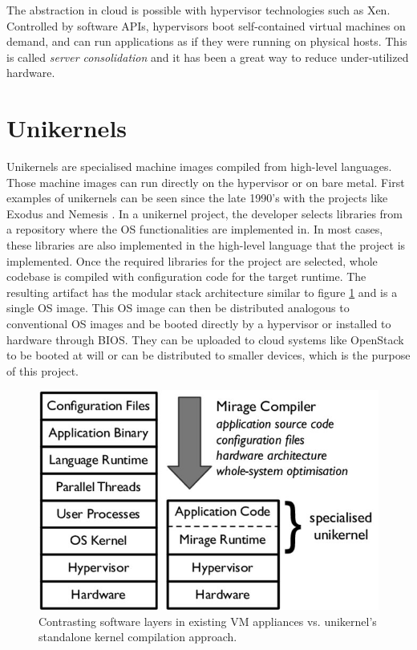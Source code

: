 The abstraction in cloud is possible with hypervisor technologies such as Xen. Controlled by software APIs, hypervisors boot self-contained virtual machines on demand, and can run applications as if they were running on physical hosts. This is called \textit{server consolidation} and it has been a great way to reduce under-utilized hardware.

\section{Unikernels}
Unikernels \cite{library-operating-system} \cite{madhavapeddy2014unikernels} are specialised machine images compiled from high-level languages. Those machine images can run directly on the hypervisor or on bare metal. First examples of unikernels can be seen since the late 1990's with the projects like Exodus \cite{exokernel} and Nemesis \cite{nemesis}. In a unikernel project, the developer selects libraries from a repository where the OS functionalities are implemented in. In most cases, these libraries are also implemented in the high-level language that the project is implemented. Once the required libraries for the project are selected, whole codebase is compiled with configuration code for the target runtime. The resulting artifact has the modular stack architecture similar to figure \ref{fig:unikernel-arch} and is a single OS image. This OS image can then be distributed analogous to conventional OS images and be booted directly by a hypervisor or installed to hardware through BIOS. They can be uploaded to cloud systems like OpenStack \cite{openstack} to be booted at will or can be distributed to smaller devices, which is the purpose of this project.

\begin{figure}[htpb]
  \centering
  \includegraphics[height=0.3\textwidth]{figures/Contrasting-software-layers-in-existing-VM-appliances-vs-unikernels-standalone-kernel_W640.jpg}
  \caption{ Contrasting software layers in existing VM appliances vs. unikernel’s standalone kernel compilation approach. \cite{library-operating-system}} \label{fig:unikernel-arch}
\end{figure}

